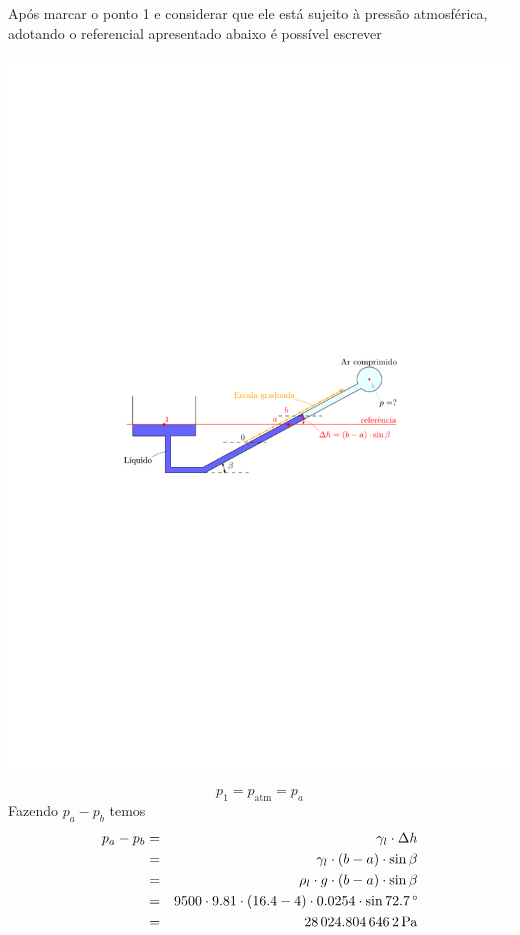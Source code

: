 \documentclass[
	a4paper,
	12pt,
	brazilian
]{article}
\begin{document}
	Após marcar o ponto 1 e considerar que ele está sujeito à pressão atmosférica, adotando o referencial apresentado abaixo é possível escrever
	\begin{center}
		\includegraphics[width=1\linewidth]{assets/images/referencia_4}
	\end{center}
	\begin{equation}
		p_{1}=p_{\textrm{atm}}=p_{a}
	\end{equation}
	Fazendo $p_{a}-p_{b}$ temos
	\begin{eqnarray}
		p_{a}-p_{b}&=&\gamma_{l}\cdot\Delta h\\
		&=&\gamma_{l}\cdot (b-a)\cdot\sin\beta\\
		&=&\rho_{l}\cdot g\cdot (b-a)\cdot\sin\beta\\
		&=&9500\cdot 9.81\cdot (16.4-4)\cdot 0.0254\cdot\sin\SI{72.7}{\SIUnitSymbolDegree}\\
		&=&\SI{28024.8046462}{\pascal}
	\end{eqnarray}
\end{document}
